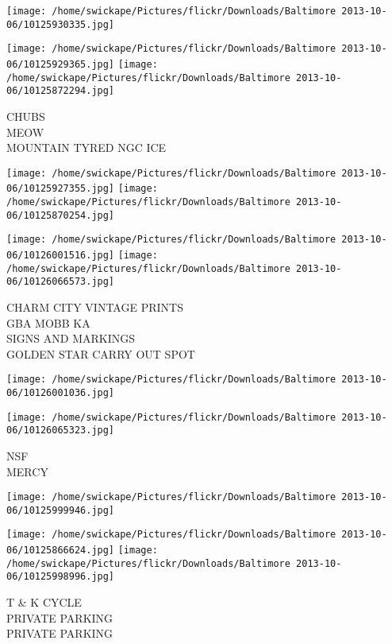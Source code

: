 \documentclass[10pt,letterpaper]{article}
\begin{document}
\texttt{[image: /home/swickape/Pictures/flickr/Downloads/Baltimore 2013-10-06/10125930335.jpg]}

\vspace{0.25in}
\texttt{[image: /home/swickape/Pictures/flickr/Downloads/Baltimore 2013-10-06/10125929365.jpg]}
\texttt{[image: /home/swickape/Pictures/flickr/Downloads/Baltimore 2013-10-06/10125872294.jpg]}

CHUBS\\
MEOW\\
MOUNTAIN TYRED NGC ICE\\
\pagebreak

\texttt{[image: /home/swickape/Pictures/flickr/Downloads/Baltimore 2013-10-06/10125927355.jpg]}
\texttt{[image: /home/swickape/Pictures/flickr/Downloads/Baltimore 2013-10-06/10125870254.jpg]}

\texttt{[image: /home/swickape/Pictures/flickr/Downloads/Baltimore 2013-10-06/10126001516.jpg]}
\texttt{[image: /home/swickape/Pictures/flickr/Downloads/Baltimore 2013-10-06/10126066573.jpg]}

CHARM CITY VINTAGE PRINTS\\
GBA MOBB KA\\
SIGNS AND MARKINGS\\
GOLDEN STAR CARRY OUT SPOT\\
\pagebreak

\texttt{[image: /home/swickape/Pictures/flickr/Downloads/Baltimore 2013-10-06/10126001036.jpg]}

\vspace{0.25in}
\texttt{[image: /home/swickape/Pictures/flickr/Downloads/Baltimore 2013-10-06/10126065323.jpg]}

NSF\\
MERCY\\
\pagebreak

\texttt{[image: /home/swickape/Pictures/flickr/Downloads/Baltimore 2013-10-06/10125999946.jpg]}

\vspace{0.25in}
\texttt{[image: /home/swickape/Pictures/flickr/Downloads/Baltimore 2013-10-06/10125866624.jpg]}
\texttt{[image: /home/swickape/Pictures/flickr/Downloads/Baltimore 2013-10-06/10125998996.jpg]}

T \& K CYCLE\\
PRIVATE PARKING\\
PRIVATE PARKING\\
\pagebreak
\end{document}
